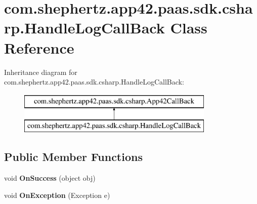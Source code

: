 \hypertarget{classcom_1_1shephertz_1_1app42_1_1paas_1_1sdk_1_1csharp_1_1_handle_log_call_back}{\section{com.\+shephertz.\+app42.\+paas.\+sdk.\+csharp.\+Handle\+Log\+Call\+Back Class Reference}
\label{classcom_1_1shephertz_1_1app42_1_1paas_1_1sdk_1_1csharp_1_1_handle_log_call_back}
}
Inheritance diagram for com.\+shephertz.\+app42.\+paas.\+sdk.\+csharp.\+Handle\+Log\+Call\+Back\+:\begin{figure}[H]
\begin{center}
\leavevmode
\includegraphics[height=2.000000cm]{classcom_1_1shephertz_1_1app42_1_1paas_1_1sdk_1_1csharp_1_1_handle_log_call_back}
\end{center}
\end{figure}
\subsection*{Public Member Functions}
\begin{DoxyCompactItemize}
\item 
\hypertarget{classcom_1_1shephertz_1_1app42_1_1paas_1_1sdk_1_1csharp_1_1_handle_log_call_back_a0d9a23a1f05edff1a160f94523d3e1a4}{void {\bfseries On\+Success} (object obj)}\label{classcom_1_1shephertz_1_1app42_1_1paas_1_1sdk_1_1csharp_1_1_handle_log_call_back_a0d9a23a1f05edff1a160f94523d3e1a4}

\item 
\hypertarget{classcom_1_1shephertz_1_1app42_1_1paas_1_1sdk_1_1csharp_1_1_handle_log_call_back_a2a6f04d3c4483664ebe05666811027f8}{void {\bfseries On\+Exception} (Exception e)}\label{classcom_1_1shephertz_1_1app42_1_1paas_1_1sdk_1_1csharp_1_1_handle_log_call_back_a2a6f04d3c4483664ebe05666811027f8}

\end{DoxyCompactItemize}
